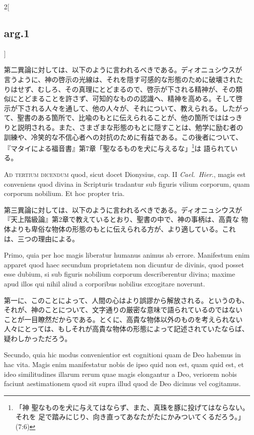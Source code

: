 \documentclass[
paper=a4paper,
fontsize=10pt,
jafontsize=9pt,
titlepage
]{jlreq}
\begin{document}
\begin{paracol}{2}[\subsection{arg.1}]
\switchcolumn

第二異論に対しては、以下のように言われるべきである。ディオニュシウスが
言うように、神の啓示の光線は、それを隠す可感的な形態のために破壊された
りはせず、むしろ、その真理にとどまるので、啓示が下される精神が、その類
似にとどまることを許さず、可知的なものの認識へ、精神を高める。そして啓
示が下される人々を通して、他の人々が、それについて、教えられる。したがっ
て、聖書のある箇所で、比喩のもとに伝えられることが、他の箇所でははっき
りと説明される。また、さまざまな形態のもとに隠すことは、勉学に励む者の
訓練や、冷笑的な不信心者への対抗のために有益である。この後者について、
『マタイによる福音書』第7章「聖なるものを犬に与えるな」\footnote{「神
聖なものを犬に与えてはならず、また、真珠を豚に投げてはならない。それを
足で踏みにじり、向き直ってあなたがたにかみついてくるだろう。」(7:6)}は
語られている。

\switchcolumn*[\subsection{ad.3}]

{\scshape Ad tertium dicendum} quod, sicut docet Dionysius, cap. II
{\itshape Cael.~Hier}., magis est conveniens quod divina in Scripturis
tradantur sub figuris vilium corporum, quam corporum nobilium. Et hoc
propter tria.

\switchcolumn

第三異論に対しては、以下のように言われるべきである。ディオニュシウスが
『天上階級論』第2章で教えているとおり、聖書の中で、神の事柄は、高貴な
物体よりも卑俗な物体の形態のもとに伝えられる方が、より適している。これ
は、三つの理由による。

\switchcolumn*

Primo, quia per hoc magis liberatur humanus animus ab
errore. Manifestum enim apparet quod haec secundum proprietatem non
dicuntur de divinis, quod posset esse dubium, si sub figuris nobilium
corporum describerentur divina; maxime apud illos qui nihil aliud a
corporibus nobilius excogitare noverunt.

\switchcolumn

第一に、このことによって、人間の心はより誤謬から解放される。というのも、
それが、神のことについて、文字通りの厳密な意味で語られているのではない
ことが一目瞭然だからである。とくに、高貴な物体以外のものを考えられない
人々にとっては、もしそれが高貴な物体の形態によって記述されていたならば、
疑わしかっただろう。

\switchcolumn*

Secundo, quia hic modus convenientior est cognitioni quam de Deo
habemus in hac vita. Magis enim manifestatur nobis de ipso quid non
est, quam quid est, et ideo similitudines illarum rerum quae magis
elongantur a Deo, veriorem nobis faciunt aestimationem quod sit supra
illud quod de Deo dicimus vel cogitamus.


\end{paracol}
\end{document}
